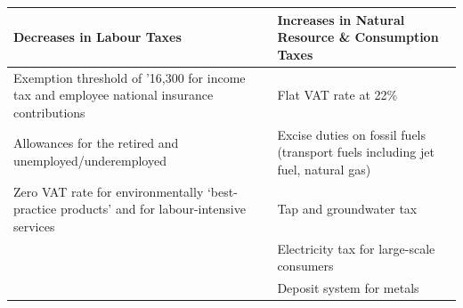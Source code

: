 \documentclass[]{tufte-handout}
\begin{document}
\begin{longtable}[]{@{}ll@{}}
\toprule
\begin{minipage}[b]{0.47\columnwidth}\raggedright
\textbf{Decreases in Labour Taxes}\strut
\end{minipage} & \begin{minipage}[b]{0.47\columnwidth}\raggedright
\textbf{Increases in Natural Resource \& Consumption Taxes}\strut
\end{minipage}\tabularnewline
\midrule
\endhead
\begin{minipage}[t]{0.47\columnwidth}\raggedright
Exemption threshold of '16,300 for income tax and employee national
insurance contributions\strut
\end{minipage} & \begin{minipage}[t]{0.47\columnwidth}\raggedright
Flat VAT rate at 22\%\strut
\end{minipage}\tabularnewline
\begin{minipage}[t]{0.47\columnwidth}\raggedright
Allowances for the retired and unemployed/underemployed\strut
\end{minipage} & \begin{minipage}[t]{0.47\columnwidth}\raggedright
Excise duties on fossil fuels (transport fuels including jet fuel,
natural gas)\strut
\end{minipage}\tabularnewline
\begin{minipage}[t]{0.47\columnwidth}\raggedright
Zero VAT rate for environmentally `best-practice products' and for
labour-intensive services\strut
\end{minipage} & \begin{minipage}[t]{0.47\columnwidth}\raggedright
Tap and groundwater tax\strut
\end{minipage}\tabularnewline
\begin{minipage}[t]{0.47\columnwidth}\raggedright
\strut
\end{minipage} & \begin{minipage}[t]{0.47\columnwidth}\raggedright
Electricity tax for large-scale consumers\strut
\end{minipage}\tabularnewline
\begin{minipage}[t]{0.47\columnwidth}\raggedright
\strut
\end{minipage} & \begin{minipage}[t]{0.47\columnwidth}\raggedright
Deposit system for metals\strut
\end{minipage}\tabularnewline
\bottomrule
\end{longtable}
\end{document}

